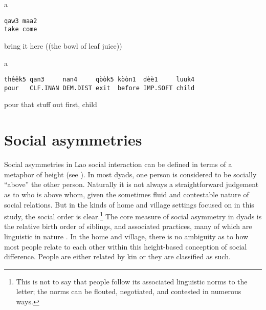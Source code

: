 \documentclass[output=paper]{langsci/langscibook}
\begin{document}
\vspace{-1mm}
%
\begin{mdframednoverticalspace}[style=firstfoc]
\begin{transbox}{1}{a}
\begin{verbatim}
qaw3 maa2
take come
\end{verbatim}
bring it here ((the bowl of leaf juice))
\end{transbox}
\end{mdframednoverticalspace}
%
\begin{mdframednoverticalspace}[style=secondfoc]
\end{mdframednoverticalspace}\vspace{-1mm}
%
\smallskip

\vspace{-1mm}
%
\begin{mdframednoverticalspace}[style=firstfoc]
\begin{transbox}{1}{a}
\begin{verbatim}
thêêk5 qan3     nan4     qòòk5 kòòn1  dèè1     luuk4
pour   CLF.INAN DEM.DIST exit  before IMP.SOFT child
\end{verbatim}
pour that stuff out first, child
\end{transbox}
\end{mdframednoverticalspace}
%
\begin{mdframednoverticalspace}[style=secondfoc]
\end{mdframednoverticalspace}\vspace{-1mm}
%

\section{Social asymmetries}\label{sec:enfield:6}

Social asymmetries in Lao social interaction can be defined in terms of a metaphor of height (see \citealt{Enfield2015b}). In most dyads, one person is considered to be socially “above” the other person. Naturally it is not always a straightforward judgement as to who is above whom, given the sometimes fluid and contestable nature of social relations. But in the kinds of home and village settings focused on in this study, the social order is clear.\footnote{This is not to say that people follow its associated linguistic norms to the letter; the norms can be flouted, negotiated, and contested in numerous ways.} The core measure of social asymmetry in dyads is the relative birth order of siblings, and associated practices, many of which are linguistic in nature \citep{Enfield2015b}. In the home and village, there is no ambiguity as to how most people relate to each other within this height-based conception of social difference. People are either related by kin or they are classified as such.
\end{document}
